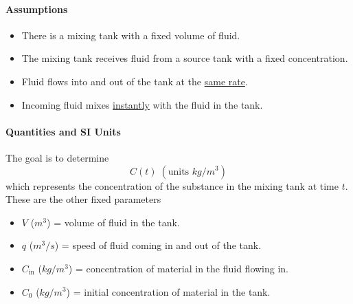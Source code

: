 \documentclass[10pt,letterpaper]{article}
\begin{document}
\paragraph{Assumptions}
\begin{itemize}
    \item There is a mixing tank with a fixed volume of fluid.
    \item The mixing tank receives fluid from a source tank with a fixed concentration.
    \item Fluid flows into and out of the tank at the \underline{same rate}.
    \item Incoming fluid mixes \underline{instantly} with the fluid in the tank.
\end{itemize}

\paragraph{Quantities and SI Units}
The goal is to determine 
$$C(t)  \;(\text{units }kg/m^3)$$
which represents the concentration of the substance in the mixing tank at time $t$. These are the other fixed parameters
\begin{itemize}
    \item $V$ ($m^3$) = volume of fluid in the tank.
    \item $q$ ($m^3/s$) = speed of fluid coming in and out of the tank.
    \item $C_{\text{in}}$ ($kg/m^3$)  = concentration of material in the fluid flowing in.
    \item $C_{0}$ ($kg/m^3$)  = initial concentration of material in the tank.
\end{itemize}
\end{document}
